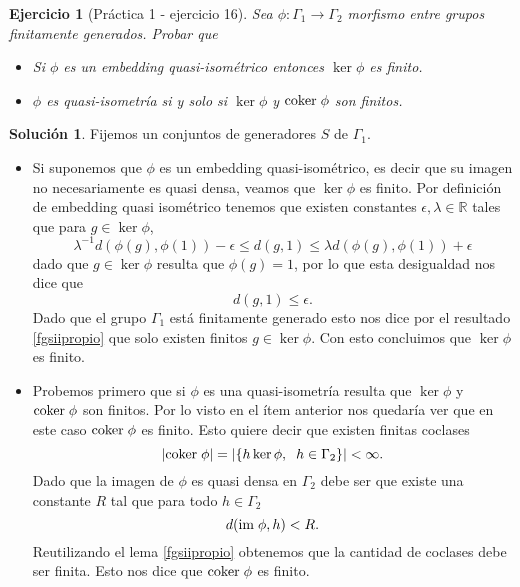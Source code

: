 \documentclass[11pt]{article}
\theoremstyle{plain}
\newtheorem*{ej}{Ejercicio}
\theoremstyle{definition}
\newtheorem*{sol}{Solución}
\theoremstyle{remark}
\newcommand\coker{\text{coker} \hspace{0.1cm} \phi}
\newcommand\im{\text{im} \hspace{0.1cm} \phi}
\newcommand\RR{\mathbb{R}}
\begin{document}
\bigskip
\begin{tcolorbox}[colback=teal!25!white,colframe=teal!75!black]
	\begin{ej}[Práctica 1 - ejercicio 16]
		Sea $\phi : \Gamma_1 \to \Gamma_2$ morfismo entre grupos finitamente generados. Probar que 
		\begin{itemize}
			\item [a)] Si $\phi$ es un embedding quasi-isométrico entonces $\ker \phi$ es finito.
			\item [b)] $\phi$ es quasi-isometría si y solo si $\ker \phi$ y $\coker$ son finitos.
		\end{itemize}
	\end{ej}
\end{tcolorbox}

\begin{sol}
	Fijemos un conjuntos de generadores $S$ de $\Gamma_1$.
	
	\begin{itemize}
		\item [a)] Si suponemos que $\phi$ es un embedding quasi-isométrico, es decir que su imagen no necesariamente es quasi densa, veamos que $\ker \phi$ es finito. Por definición de embedding quasi isométrico tenemos que existen constantes $\epsilon, \lambda \in \RR$ tales que para $g \in \ker \phi$,
		\[
		\lambda^{-1} d(\phi(g), \phi(1)) - \epsilon \le d(g,1)  \le \lambda d(\phi(g), \phi(1)) + \epsilon
		\]
		dado que $g \in \ker \phi$ resulta que $\phi(g)=1$, por lo que esta desigualdad nos dice que
		\[
		d(g,1) \le \epsilon.
		\]
		Dado que el grupo $\Gamma_1$ está finitamente generado esto nos dice por el resultado \ref{fgsiipropio} que solo existen finitos $g \in \ker \phi$. Con esto concluimos que $\ker \phi$ es finito.
		
		\item [b)] Probemos primero que si $\phi$ es una quasi-isometría resulta que $\ker \phi$ y $\coker$ son finitos. Por lo visto en el ítem anterior nos quedaría ver que en este caso $\coker$ es finito. Esto quiere decir que existen finitas coclases
		\[
		|\coker| =  |\{h \ker \phi, \hspace{0.2cm} h \in \Gamma_2\}| < \infty.
		\]
		Dado que la imagen de $\phi$ es quasi densa en $\Gamma_2$ debe ser que existe una constante $R$ tal que para todo $h \in \Gamma_2$
		\[
		d(\im, h ) < R.
		\]
		Reutilizando el lema \ref{fgsiipropio} obtenemos que la cantidad de coclases debe ser finita. Esto nos dice que $\coker$ es finito.
		
		\medskip
		

\end{itemize}
\end{sol}
\end{document}
